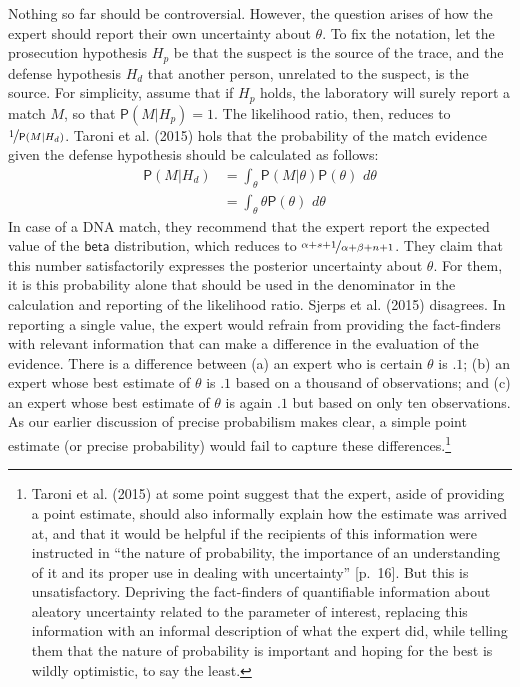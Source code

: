 \documentclass[
  10pt,
  dvipsnames,enabledeprecatedfontcommands]{scrartcl}
\newcommand{\pr}[1]{\mathsf{P}(#1)}
\newcommand{\s}[1]{\mbox{$\mathsf{#1}$}}
\begin{document}
Nothing so far should be controversial. However, the question arises of
how the expert should report their own uncertainty about \(\theta\). To
fix the notation, let the prosecution hypothesis \(H_p\) be that the
suspect is the source of the trace, and the defense hypothesis \(H_d\)
that another person, unrelated to the suspect, is the source. For
simplicity, assume that if \(H_p\) holds, the laboratory will surely
report a match \(M\), so that \(\pr{M\vert H_p}=1\). The likelihood
ratio, then, reduces to \(\nicefrac{1}{\pr{M \vert H_d}}\). Taroni et
al. (2015) hols that the probability of the match evidence given the
defense hypothesis should be calculated as follows:
\begin{align*}\pr{M \vert H_d} & = \int_{\theta} \pr{M\vert \theta} \pr{\theta}\,\, d\theta \\
& =  \int_\theta  \theta \pr{\theta}\,\, d\theta
\end{align*} In case of a DNA match, they recommend that the expert
report the expected value of the \(\s{beta}\) distribution, which
reduces to \(\nicefrac{\alpha + s + 1}{\alpha + \beta +n + 1}\). They
claim that this number satisfactorily expresses the posterior
uncertainty about \(\theta\). For them, it is this probability alone
that should be used in the denominator in the calculation and reporting
of the likelihood ratio. Sjerps et al. (2015) disagrees. In reporting a
single value, the expert would refrain from providing the fact-finders
with relevant information that can make a difference in the evaluation
of the evidence. There is a difference between (a) an expert who is
certain \(\theta\) is \(.1\); (b) an expert whose best estimate of
\(\theta\) is \(.1\) based on a thousand of observations; and (c) an
expert whose best estimate of \(\theta\) is again \(.1\) but based on
only ten observations. As our earlier discussion of precise probabilism
makes clear, a simple point estimate (or precise probability) would fail
to capture these differences.\footnote{\hfill\break
  Taroni et al. (2015) at some point suggest that the expert, aside of
  providing a point estimate, should also informally explain how the
  estimate was arrived at, and that it would be helpful if the
  recipients of this information were instructed in ``the nature of
  probability, the importance of an understanding of it and its proper
  use in dealing with uncertainty'' {[}p.~16{]}. But this is
  unsatisfactory. Depriving the fact-finders of quantifiable information
  about aleatory uncertainty related to the parameter of interest,
  replacing this information with an informal description of what the
  expert did, while telling them that the nature of probability is
  important and hoping for the best is wildly optimistic, to say the
  least.}
\end{document}
